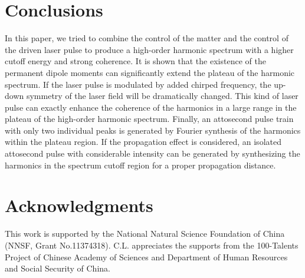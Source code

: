 \documentclass[10pt,letterpaper]{article}
\begin{document}
\section{Conclusions}
In this paper, we tried to combine the control of the matter and the control of the driven laser pulse to produce a high-order harmonic spectrum with a higher cutoff energy and strong coherence. It is shown that the existence of the permanent dipole moments can significantly extend the plateau of the harmonic spectrum. If the laser pulse is modulated by added chirped frequency, the up-down symmetry of the laser field will be dramatically changed. This kind of laser pulse can exactly enhance the coherence of the harmonics in a large range in the plateau of the high-order harmonic spectrum. Finally, an attosecond pulse train with only two individual peaks is generated by Fourier synthesis of the harmonics within the plateau region. If the propagation effect is considered, an isolated attosecond pulse with considerable intensity can be generated by synthesizing the harmonics in the spectrum cutoff region for a proper propagation distance.

\section*{Acknowledgments}
This work is supported by the National Natural Science Foundation of China (NNSF, Grant
No.11374318). C.L. appreciates the supports from the 100-Talents Project of Chinese Academy
of Sciences and Department of Human Resources and Social Security of China.
\end{document}
